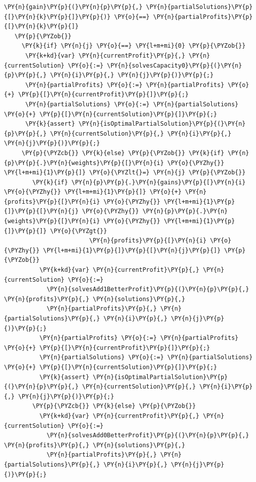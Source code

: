 \begin{sloppypar}
\begin{Verbatim}[commandchars=\\\{\}]
    \PY{n}{gain}\PY{p}{(}\PY{n}{p}\PY{p}{,} \PY{n}{partialSolutions}\PY{p}{[}\PY{n}{k}\PY{p}{]}\PY{p}{)} \PY{o}{==} \PY{n}{partialProfits}\PY{p}{[}\PY{n}{k}\PY{p}{]}
   \PY{p}{\PYZob{}}
     \PY{k}{if} \PY{n}{j} \PY{o}{==} \PY{l+m+mi}{0} \PY{p}{\PYZob{}}
      \PY{k+kd}{var} \PY{n}{currentProfit}\PY{p}{,} \PY{n}{currentSolution} \PY{o}{:=} \PY{n}{solvesCapacity0}\PY{p}{(}\PY{n}{p}\PY{p}{,} \PY{n}{i}\PY{p}{,} \PY{n}{j}\PY{p}{)}\PY{p}{;}
      \PY{n}{partialProfits} \PY{o}{:=} \PY{n}{partialProfits} \PY{o}{+} \PY{p}{[}\PY{n}{currentProfit}\PY{p}{]}\PY{p}{;}
      \PY{n}{partialSolutions} \PY{o}{:=} \PY{n}{partialSolutions} \PY{o}{+} \PY{p}{[}\PY{n}{currentSolution}\PY{p}{]}\PY{p}{;}
      \PY{k}{assert} \PY{n}{isOptimalPartialSolution}\PY{p}{(}\PY{n}{p}\PY{p}{,} \PY{n}{currentSolution}\PY{p}{,} \PY{n}{i}\PY{p}{,} \PY{n}{j}\PY{p}{)}\PY{p}{;}
     \PY{p}{\PYZcb{}} \PY{k}{else} \PY{p}{\PYZob{}} \PY{k}{if} \PY{n}{p}\PY{p}{.}\PY{n}{weights}\PY{p}{[}\PY{n}{i} \PY{o}{\PYZhy{}} \PY{l+m+mi}{1}\PY{p}{]} \PY{o}{\PYZlt{}=} \PY{n}{j} \PY{p}{\PYZob{}}
        \PY{k}{if} \PY{n}{p}\PY{p}{.}\PY{n}{gains}\PY{p}{[}\PY{n}{i} \PY{o}{\PYZhy{}} \PY{l+m+mi}{1}\PY{p}{]} \PY{o}{+} \PY{n}{profits}\PY{p}{[}\PY{n}{i} \PY{o}{\PYZhy{}} \PY{l+m+mi}{1}\PY{p}{]}\PY{p}{[}\PY{n}{j} \PY{o}{\PYZhy{}} \PY{n}{p}\PY{p}{.}\PY{n}{weights}\PY{p}{[}\PY{n}{i} \PY{o}{\PYZhy{}} \PY{l+m+mi}{1}\PY{p}{]}\PY{p}{]} \PY{o}{\PYZgt{}} 
                        \PY{n}{profits}\PY{p}{[}\PY{n}{i} \PY{o}{\PYZhy{}} \PY{l+m+mi}{1}\PY{p}{]}\PY{p}{[}\PY{n}{j}\PY{p}{]} \PY{p}{\PYZob{}}
          \PY{k+kd}{var} \PY{n}{currentProfit}\PY{p}{,} \PY{n}{currentSolution} \PY{o}{:=} 
            \PY{n}{solvesAdd1BetterProfit}\PY{p}{(}\PY{n}{p}\PY{p}{,} \PY{n}{profits}\PY{p}{,} \PY{n}{solutions}\PY{p}{,} 
            \PY{n}{partialProfits}\PY{p}{,} \PY{n}{partialSolutions}\PY{p}{,} \PY{n}{i}\PY{p}{,} \PY{n}{j}\PY{p}{)}\PY{p}{;}
          \PY{n}{partialProfits} \PY{o}{:=} \PY{n}{partialProfits} \PY{o}{+} \PY{p}{[}\PY{n}{currentProfit}\PY{p}{]}\PY{p}{;}
          \PY{n}{partialSolutions} \PY{o}{:=} \PY{n}{partialSolutions} \PY{o}{+} \PY{p}{[}\PY{n}{currentSolution}\PY{p}{]}\PY{p}{;}
          \PY{k}{assert} \PY{n}{isOptimalPartialSolution}\PY{p}{(}\PY{n}{p}\PY{p}{,} \PY{n}{currentSolution}\PY{p}{,} \PY{n}{i}\PY{p}{,} \PY{n}{j}\PY{p}{)}\PY{p}{;}
        \PY{p}{\PYZcb{}} \PY{k}{else} \PY{p}{\PYZob{}}
          \PY{k+kd}{var} \PY{n}{currentProfit}\PY{p}{,} \PY{n}{currentSolution} \PY{o}{:=} 
            \PY{n}{solvesAdd0BetterProfit}\PY{p}{(}\PY{n}{p}\PY{p}{,} \PY{n}{profits}\PY{p}{,} \PY{n}{solutions}\PY{p}{,} 
            \PY{n}{partialProfits}\PY{p}{,} \PY{n}{partialSolutions}\PY{p}{,} \PY{n}{i}\PY{p}{,} \PY{n}{j}\PY{p}{)}\PY{p}{;}

\end{Verbatim}
\end{sloppypar}

